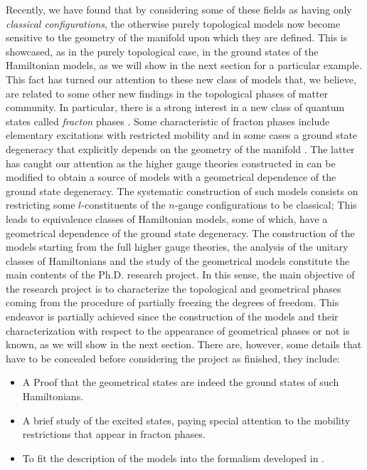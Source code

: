 \documentclass[a4paper,11pt]{article}
\theoremstyle{plain}%
\theoremstyle{definition}
\theoremstyle{remark}
\begin{document}
Recently, we have found that by considering some of these fields as having only \emph{classical configurations}, the otherwise purely topological models now become sensitive to the geometry of the manifold upon which they are defined. This is showcased, as in the purely topological case, in the ground states of the Hamiltonian models, as we will show in the next section for a particular example. This fact has turned our attention to these new class of models that, we believe, are related to some other new findings in the topological phases of matter community. In particular, there is a strong interest in a new class of quantum states called \emph{fracton} phases \cite{Chamon05,Bravyi11,Castelnovo12,Haah11,bravyi13,yoshida13,Vijay15,Vijay16,Vijay17,
Shirley18,Nandkishore18}. Some characteristic of fracton phases include elementary excitations with restricted mobility and in some cases a ground state degeneracy that explicitly depends on the geometry of the manifold \cite{Slagle17}. The latter has caught our attention as the higher gauge theories constructed in \cite{higher} can be modified to obtain a source of models with a geometrical dependence of the ground state degeneracy. The systematic construction of such models consists on restricting some $l$-constituents of the $n$-gauge configurations to be classical; This leads to equivalence classes of Hamiltonian models, some of which, have a geometrical dependence of the ground state degeneracy.  The construction of the models starting from the full higher gauge theories, the analysis of the unitary classes of Hamiltonians and the study of the geometrical models constitute the main contents of the Ph.D. research project. In this sense, the main objective of the research project is to characterize the topological and geometrical phases coming from the procedure of partially freezing the degrees of freedom. This endeavor is partially achieved since the construction of the models and their characterization with respect to the appearance of geometrical phases or not is known, as we will show in the next section. There are, however, some details that have to be concealed before considering the project as finished, they include:
\begin{itemize}
\item A Proof that the geometrical states are indeed the ground states of such Hamiltonians.
\item A brief study of the excited states, paying special attention to the mobility restrictions that appear in fracton phases.
\item To fit the description of the models into the formalism developed in \cite{higher}.
\end{itemize}
\end{document}
